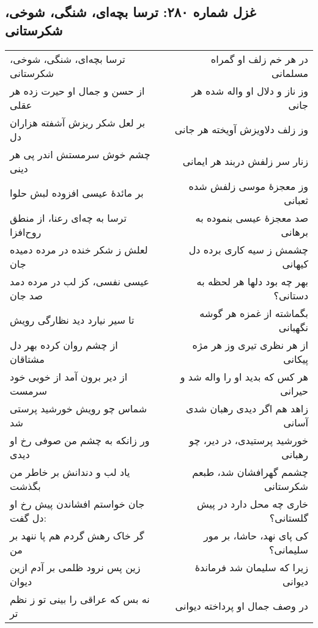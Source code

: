\begin{center}
\section*{غزل شماره ۲۸۰: ترسا بچه‌ای، شنگی، شوخی، شکرستانی}
\label{sec:280}
\begin{longtable}{l p{0.5cm} r}
ترسا بچه‌ای، شنگی، شوخی، شکرستانی
&&
در هر خم زلف او گمراه مسلمانی
\\
از حسن و جمال او حیرت زده هر عقلی
&&
وز ناز و دلال او واله شده هر جانی
\\
بر لعل شکر ریزش آشفته هزاران دل
&&
وز زلف دلاویزش آویخته هر جانی
\\
چشم خوش سرمستش اندر پی هر دینی
&&
زنار سر زلفش دربند هر ایمانی
\\
بر مائدهٔ عیسی افزوده لبش حلوا
&&
وز معجزهٔ موسی زلفش شده ثعبانی
\\
ترسا به چه‌ای رعنا، از منطق روح‌افزا
&&
صد معجزهٔ عیسی بنموده به برهانی
\\
لعلش ز شکر خنده در مرده دمیده جان
&&
چشمش ز سیه کاری برده دل کیهانی
\\
عیسی نفسی، کز لب در مرده دمد صد جان
&&
بهر چه بود دلها هر لحظه به دستانی؟
\\
تا سیر نیارد دید نظارگی رویش
&&
بگماشته از غمزه هر گوشه نگهبانی
\\
از چشم روان کرده بهر دل مشتاقان
&&
از هر نظری تیری وز هر مژه پیکانی
\\
از دیر برون آمد از خوبی خود سرمست
&&
هر کس که بدید او را واله شد و حیرانی
\\
شماس چو رویش خورشید پرستی شد
&&
زاهد هم اگر دیدی رهبان شدی آسانی
\\
ور زانکه به چشم من صوفی رخ او دیدی
&&
خورشید پرستیدی، در دیر، چو رهبانی
\\
یاد لب و دندانش بر خاطر من بگذشت
&&
چشمم گهرافشان شد، طبعم شکرستانی
\\
جان خواستم افشاندن پیش رخ او دل گفت:
&&
خاری چه محل دارد در پیش گلستانی؟
\\
گر خاک رهش گردم هم پا ننهد بر من
&&
کی پای نهد، حاشا، بر مور سلیمانی؟
\\
زین پس نرود ظلمی بر آدم ازین دیوان
&&
زیرا که سلیمان شد فرماندهٔ دیوانی
\\
نه بس که عراقی را بینی تو ز نظم تر
&&
در وصف جمال او پرداخته دیوانی
\\
\end{longtable}
\end{center}
